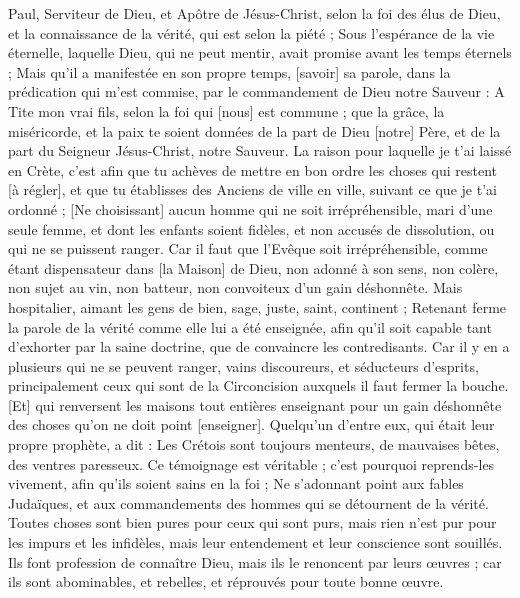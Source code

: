 \BFont
\begin{multicols}{2}
\VerseOne{}Paul, Serviteur de Dieu, et Apôtre de Jésus-Christ, selon la foi des élus de Dieu, et la connaissance de la vérité, qui est selon la piété ;
Sous l'espérance de la vie éternelle, laquelle Dieu, qui ne peut mentir, avait promise avant les temps éternels ;
Mais qu'il a manifestée en son propre temps, [savoir] sa parole, dans la prédication qui m'est commise, par le commandement de Dieu notre Sauveur :
A Tite mon vrai fils, selon la foi qui [nous] est commune ; que la grâce, la miséricorde, et la paix te soient données de la part de Dieu [notre] Père, et de la part du Seigneur Jésus-Christ, notre Sauveur.
La raison pour laquelle je t'ai laissé en Crète, c'est afin que tu achèves de mettre en bon ordre les choses qui restent [à régler], et que tu établisses des Anciens de ville en ville, suivant ce que je t'ai ordonné ;
[Ne choisissant] aucun homme qui ne soit irrépréhensible, mari d'une seule femme, et dont les enfants soient fidèles, et non accusés de dissolution, ou qui ne se puissent ranger.
Car il faut que l'Evêque soit irrépréhensible, comme étant dispensateur dans [la Maison] de Dieu, non adonné à son sens, non colère, non sujet au vin, non batteur, non convoiteux d'un gain déshonnête.
Mais hospitalier, aimant les gens de bien, sage, juste, saint, continent ;
Retenant ferme la parole de la vérité comme elle lui a été enseignée, afin qu'il soit capable tant d'exhorter par la saine doctrine, que de convaincre les contredisants.
Car il y en a plusieurs qui ne se peuvent ranger, vains discoureurs, et séducteurs d'esprits, principalement ceux qui sont de la Circoncision auxquels il faut fermer la bouche.
[Et] qui renversent les maisons tout entières enseignant pour un gain déshonnête des choses qu'on ne doit point [enseigner].
Quelqu'un d'entre eux, qui était leur propre prophète, a dit : Les Crétois sont toujours menteurs, de mauvaises bêtes, des ventres paresseux.
Ce témoignage est véritable ; c'est pourquoi reprends-les vivement, afin qu'ils soient sains en la foi ;
Ne s'adonnant point aux fables Judaïques, et aux commandements des hommes qui se détournent de la vérité.
Toutes choses sont bien pures pour ceux qui sont purs, mais rien n'est pur pour les impurs et les infidèles, mais leur entendement et leur conscience sont souillés.
Ils font profession de connaître Dieu, mais ils le renoncent par leurs œuvres ; car ils sont abominables, et rebelles, et réprouvés pour toute bonne œuvre.

\end{multicols}
